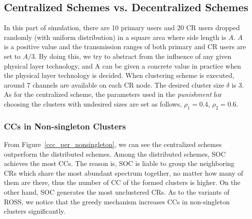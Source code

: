 \documentclass[times]{ettauth}
\theoremstyle{mytheoremstyle}
\theoremstyle{mytheoremstyle}
\theoremstyle{mytheoremstyle}
\begin{document}
\subsection{Centralized Schemes vs. Decentralized Schemes}
In this part of simulation, there are 10 primary users and 20 CR users dropped randomly (with uniform distribution) in a square area where side length is $A$.
$A$ is a positive value and the transmission ranges of both primary and CR users are set to $A/3$.
By doing this, we try to abstract from the influence of any given physical layer technology, and A can be given a concrete value in practice when the physical layer technology is decided.
When clustering scheme is executed, around 7 channels are available on each CR node.
The desired cluster size $\delta$ is 3.
As for the centralized scheme, the parameters used in the \textit{punishment} for choosing the clusters with undesired sizes are set as follows, $\rho_1 =  0.4$, $\rho_2 =  0.6$.


\subsubsection{CCs in Non-singleton Clusters}
\label{ccc_20}
From Figure~\ref{ccc_per_nonsingleton}, we can see the centralized schemes outperform the distributed schemes.
Among the distributed schemes, SOC achieves the most CCs.
The reason is, SOC is liable to group the neighboring CRs which share the most abundant spectrum together, no matter how many of them are there, thus the number of CC of the formed clusters is higher.
On the other hand, SOC generates the most unclustered CRs.
As to the variants of ROSS, we notice that the greedy mechanism increases CCs in non-singleton clusters significantly.
\end{document}
